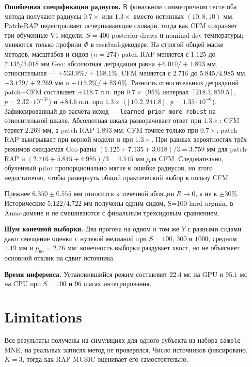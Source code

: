 \textbf{Ошибочная спецификация радиусов.} В финальном симметричном тесте оба метода получают радиусы $0.7\times$ или $1.3\times$ вместо истинных $(10,8,10)$ мм. Patch-RAP перестраивает исчерпывающие словари, тогда как CFM сохраняет три обученные V1-модели, $S=400$ posterior draws и nominal-dev температуры; меняются только профили $\Phi$ в residual-декодере. На строгой общей маске методов, масштабов и сидов ($n=274$) patch-RAP меняется с $1.125$ до $7.135/3.018$ мм Geo: абсолютная деградация равна $+6.010/+1.893$ мм, относительная --- $+533.9\%/+168.1\%$. CFM меняется с $2.716$ до $5.845/4.985$ мм: $+3.129/+2.269$ мм и $+115.2\%/+83.6\%$. Разность относительных деградаций patch$-$CFM составляет $+418.7$ п.п. при $0.7\times$ (95\% интервал $[218.3,859.5]$, $p=2.32\cdot10^{-37}$) и $+84.6$ п.п. при $1.3\times$ ($[10.2,241.8]$, $p=1.35\cdot10^{-6}$). Зафиксированный до расчёта исход --- \texttt{learned\_prior\_more\_robust} на относительной шкале. Абсолютная шкала разворачивает ответ при $1.3\times$: CFM теряет $2.269$ мм, а patch-RAP $1.893$ мм. CFM точнее только при $0.7\times$; patch-RAP выигрывает при верной модели и при $1.3\times$. При равных вероятностях трёх режимов ожидаемая Geo равна $(1.125+7.135+3.018)/3=3.759$ мм для patch-RAP и $(2.716+5.845+4.985)/3=4.515$ мм для CFM. Следовательно, обученный prior пропорционально мягче к ошибке радиусов, но этого недостаточно, чтобы развернуть общий практический выбор в пользу CFM.

Прежнее $6.350\pm0.555$ мм относится к точечной абляции $R\to0$, а не к $\pm30\%$. Исторические $5.122/4.722$ мм получены одним сидом, S=100 hard argmin, в Anna-домене и не смешиваются с финальным трёхсидовым сравнением.

\textbf{Шум конечной выборки.} Два прогона на одном и том же $Y$ с разными сидами дают смещение оценки с нулевой медианой при $S=100$, $300$ и $1000$, средним $1.19$ мм и $p_{90}=2.76$ мм: конечность выборки раздувает хвост, но не объясняет основной отклик на сдвиг источника.

\textbf{Время инференса.} Установившийся режим составляет $22.4$ мс на GPU и $95.1$ мс на CPU при $S=100$ и $96$ шагах интегрирования.

\section{Limitations}

Все результаты получены на симуляциях для одного субъекта из набора \texttt{sample} MNE; на реальных записях метод не проверялся. Число источников фиксировано, $K=3$, тогда как RAP MUSIC оценивает его самостоятельно.

